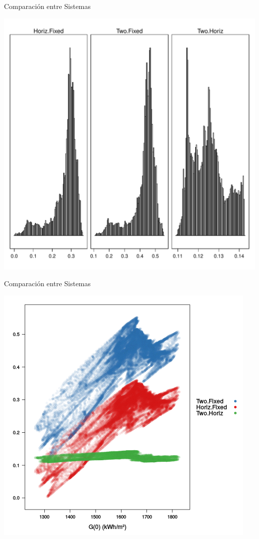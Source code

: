 \documentclass[xcolor={usenames,svgnames,dvipsnames}]{beamer}
\begin{document}
\begin{frame}[label={sec:org3553800}]{Comparación entre Sistemas}
\begin{center}
\includegraphics[width=.9\linewidth]{../figs/compSystems.pdf}
\end{center}
\end{frame}

\begin{frame}[label={sec:orgb6eb646}]{Comparación entre Sistemas}
\begin{center}
\includegraphics[width=.9\linewidth]{../figs/compSystemsG0.png}
\end{center}
\end{frame}
\end{document}
